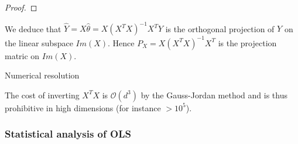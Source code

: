 \documentclass[
10pt, %
a4paper, %
oneside, %
headinclude,footinclude, %
BCOR5mm, %
]{scrartcl}
\begin{document}
\begin{proof}
% 
% 
% 
% 
% 
% 
% 
% 
% 
% 

\end{proof}

\begin{remark}

    We deduce that $ \hat{Y} = X \hat{\theta} = X(X^TX)^{-1}X^TY$ is the orthogonal projection of $Y$ on the linear subspace $ Im(X)$. Hence $P_X = X(X^TX)^{-1}X^T$ is the projection matric on $Im(X)$.
    
\end{remark}


\begin{remark}{Numerical resolution}

The cost of inverting $X^TX$ is $ \mathcal{O} (d^3)$ by the Gauss-Jordan method and is thus prohibitive in high dimensions (for instance $ > 10^5$).
\end{remark}


\subsubsection{\large\color{Periwinkle}Statistical analysis of OLS}
\end{document}

